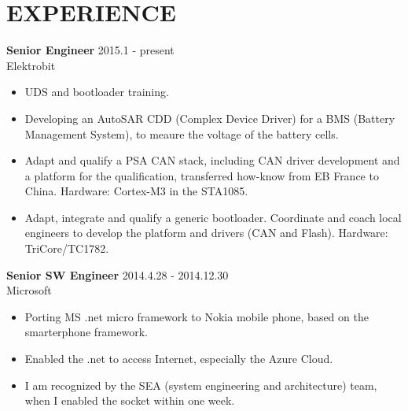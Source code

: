 
\section{EXPERIENCE}
\textbf{Senior Engineer} \hfill 2015.1 - present \\
        Elektrobit
        \begin{itemize}  \itemsep -2pt %
        \item UDS and bootloader training.
        \item Developing an AutoSAR CDD (Complex Device Driver) for a BMS (Battery Management System),
              to meaure the voltage of the battery cells.
        \item Adapt and qualify a PSA CAN stack, including CAN driver development and a platform for the qualification,
              transferred how-know from EB France to China.
              Hardware: Cortex-M3 in the STA1085.
        \item Adapt, integrate and qualify a generic bootloader.
              Coordinate and coach local engineers to develop the platform and drivers (CAN and Flash).
              Hardware: TriCore/TC1782.
        \end{itemize}

\textbf{Senior SW Engineer} \hfill 2014.4.28 - 2014.12.30\\
        Microsoft
        \begin{itemize}  \itemsep -2pt %
                \item Porting MS .net micro framework to Nokia mobile phone, based on the smarterphone framework.
                \item Enabled the .net to access Internet, especially the Azure Cloud.
                \item I am recognized by the SEA (system engineering and architecture) team, when I enabled the socket within one week.
        \end{itemize}

